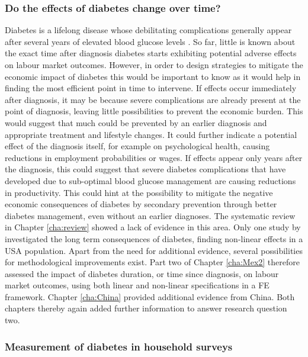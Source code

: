 \subsubsection*{Do the effects of diabetes change over time?}

Diabetes is a lifelong disease whose debilitating complications generally appear after several years of elevated blood glucose levels \parencite{WorldHealthOrganization2016}. So far, little is known about the exact time after diagnosis diabetes starts exhibiting potential adverse effects on labour market outcomes. However, in order to design strategies to mitigate the economic impact of diabetes this would be important to know as it would help in finding the most efficient point in time to intervene. If effects occur immediately after diagnosis, it may be because severe complications are already present at the point of diagnosis, leaving little possibilities to prevent the economic burden. This would suggest that much could be prevented by an earlier diagnosis and appropriate treatment and lifestyle changes. It could further indicate a potential effect of the diagnosis itself, for example on psychological health, causing reductions in employment probabilities or wages. If effects appear only years after the diagnosis, this could suggest that severe diabetes complications that have developed due to sub-optimal blood glucose management are causing reductions in productivity. This could hint at the possibility to mitigate the negative economic consequences of diabetes by secondary prevention through better diabetes management, even without an earlier diagnoses. The systematic review in Chapter \ref{cha:review} showed a lack of evidence in this area. Only one study by \textcite{Minor2013} investigated the long term consequences of diabetes, finding non-linear effects in a USA population. Apart from the need for additional evidence, several possibilities for methodological improvements exist. Part two of Chapter \ref{cha:Mex2} therefore assessed the impact of diabetes duration, or time since diagnosis, on labour market outcomes, using both linear and non-linear specifications in a \ac{FE} framework. Chapter \ref{cha:China} provided additional evidence from China. Both chapters thereby again added further information to answer research question two.

\subsubsection*{Measurement of diabetes in household surveys}

